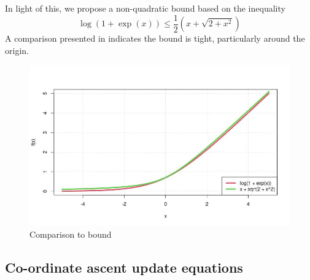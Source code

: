 \documentclass[12pt]{article}
\begin{document}
In light of this, we propose a non-quadratic bound based on the inequality 
\begin{equation}
\log(1 + \exp(x)) \leq \frac{1}{2} \left( x + \sqrt{2 + x^2} \right)
\end{equation}
A comparison presented in  indicates the bound is tight, particularly around the origin.
\begin{figure}[htp]
    \centering
    \includegraphics[width=\textwidth]{./figures/bounds.jpg}
    \caption{Comparison to bound}
    \label{fig:bounds_comparison}
\end{figure}


\subsection{Co-ordinate ascent update equations}
\end{document}
